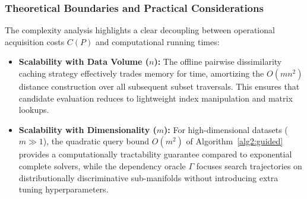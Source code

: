 \subsubsection{Theoretical Boundaries and Practical Considerations}
The complexity analysis highlights a clear decoupling between operational acquisition costs $C(P)$ and computational running times:
\begin{itemize}
	\item \textbf{Scalability with Data Volume ($n$):} The offline pairwise dissimilarity caching strategy effectively trades memory for time, amortizing the $O(m n^2)$ distance construction over all subsequent subset traversals. This ensures that candidate evaluation reduces to lightweight index manipulation and matrix lookups.
	\item \textbf{Scalability with Dimensionality ($m$):} For high-dimensional datasets ($m \gg 1$), the quadratic query bound $O(m^2)$ of Algorithm~\ref{alg2:guided} provides a computationally tractability guarantee compared to exponential complete solvers, while the dependency oracle $\Gamma$ focuses search trajectories on distributionally discriminative sub-manifolds without introducing extra tuning hyperparameters.
\end{itemize}